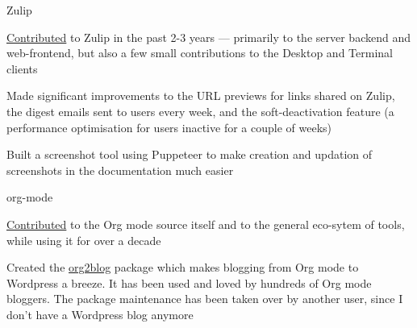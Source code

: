 
\begin{cventries}

  \cventry
      {Zulip }
      {}
      {} %
      {} %
      {
        \begin{cvitems} %
        \item {\href{https://github.com/zulip/zulip/commits?author=punchagan}{Contributed} to Zulip in the past 2-3 years --- primarily to the server backend and web-frontend, but also a few small contributions to the Desktop and Terminal clients}
        \item {Made significant improvements to the URL previews for links shared on Zulip, the digest emails sent to users every week, and the soft-deactivation feature (a performance optimisation for users inactive for a couple of weeks)}
        \item {Built a screenshot tool using Puppeteer to make creation and updation of screenshots in the documentation much easier}
        \end{cvitems}
      }
  \cventry
      {org-mode }
      {}
      {} %
      {} %
      {
        \begin{cvitems} %
        \item{\href{https://github.com/bzg/org-mode/commits?author=punchagan}{Contributed} to the Org mode source itself and to the general eco-sytem of tools, while using it for over a decade}
        \item{Created the \href{https://github.com/org2blog/org2blog/commits?author=punchagan}{org2blog} package which makes blogging from Org mode to Wordpress a breeze. It has been used and loved by hundreds of Org mode bloggers. The package maintenance has been taken over by another user, since I don't have a Wordpress blog anymore}

\end{cvitems}}
\end{cventries}
